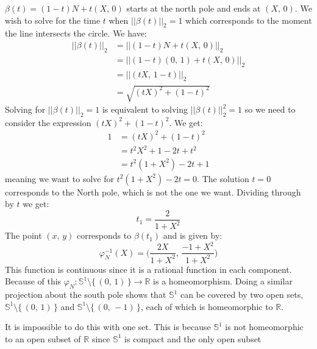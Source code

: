 \documentclass{article}
\theoremstyle{plain}
\theoremstyle{normal}
\begin{document}
        $\beta(t)=(1-t)N+t(X,\,0)$ starts at the north pole and ends at
        $(X,\,0)$. We wish to solve for the time $t$ when
        $||\beta(t)||_{2}=1$ which corresponds to the moment the line
        intersects the circle. We have:
        \begin{align}
            ||\beta(t)||_{2}
            &=||(1-t)N+t(X,\,0)||_{2}\\
            &=||(1-t)(0,\,1)+t(X,\,0)||_{2}\\
            &=||(tX,\,1-t)||_{2}\\
            &=\sqrt{(tX)^{2}+(1-t)^{2}}
        \end{align}
        Solving for $||\beta(t)||_{2}=1$ is equivalent to solving
        $||\beta(t)||_{2}^{2}=1$ so we need to consider the expression
        $(tX)^{2}+(1-t)^{2}$. We get:
        \begin{align}
            1&=(tX)^{2}+(1-t)^{2}\\
            &=t^{2}X^{2}+1-2t+t^{2}\\
            &=t^{2}(1+X^{2})-2t+1
        \end{align}
        meaning we want to solve for $t^{2}(1+X^{2})-2t=0$. The solution
        $t=0$ corresponds to the North pole, which is not the one we want.
        Dividing through by $t$ we get:
        \begin{equation}
            t_{1}=\frac{2}{1+X^{2}}
        \end{equation}
        The point $(x,\,y)$ corresponds to $\beta(t_{1})$ and is given by:
        \begin{equation}
            \varphi_{N}^{-1}(X)=
            \Big(\frac{2X}{1+X^{2}},\,\frac{-1+X^{2}}{1+X^{2}}\Big)
        \end{equation}
        This function is continuous since it is a rational function in each
        component. Because of this
        $\varphi_{N}:\mathbb{S}^{1}\setminus\{\,(0,\,1)\,\}\rightarrow\mathbb{R}$
        is a homeomorphism. Doing a similar projection about the south pole
        shows that $\mathbb{S}^{1}$ can be covered by two open sets,
        $\mathbb{S}^{1}\setminus\{\,(0,\,1)\,\}$ and
        $\mathbb{S}^{1}\setminus\{\,(0,\,-1)\,\}$, each of which is
        homeomorphic to $\mathbb{R}$.
        \par\hfill\par
        It is impossible to do this with one set. This is because
        $\mathbb{S}^{1}$ is not homeomorphic to an open subset of
        $\mathbb{R}$ since $\mathbb{S}^{1}$ is compact and the only open subset
\end{document}
